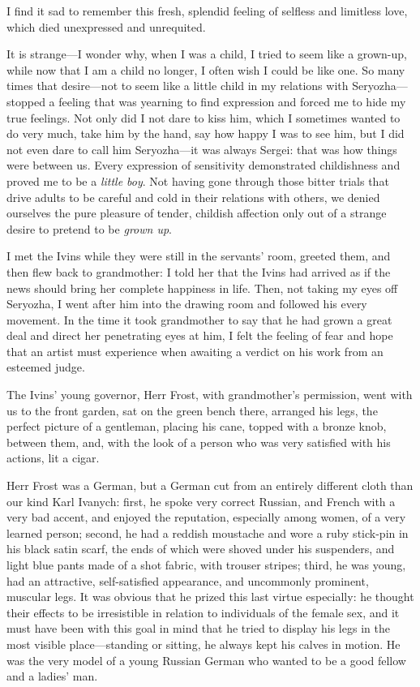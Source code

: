 I find it sad to remember this fresh, splendid feeling of selfless and limitless love, which died unexpressed and unrequited.

It is strange---I wonder why, when I was a child, I tried to seem like a grown-up, while now that I am a child no longer, I often wish I could be like one. So many times that desire---not to seem like a little child in my relations with Seryozha---stopped a feeling that was yearning to find expression and forced me to hide my true feelings. Not only did I not dare to kiss him, which I sometimes wanted to do very much, take him by the hand, say how happy I was to see him, but I did not even dare to call him Seryozha---it was always Sergei: that was how things were between us. Every expression of sensitivity demonstrated childishness and proved me to be a \emph{little boy}. Not having gone through those bitter trials that drive adults to be careful and cold in their relations with others, we denied ourselves the pure pleasure of tender, childish affection only out of a strange desire to pretend to be \emph{grown up}.

I met the Ivins while they were still in the servants' room, greeted them, and then flew back to grandmother: I told her that the Ivins had arrived as if the news should bring her complete happiness in life. Then, not taking my eyes off Seryozha, I went after him into the drawing room and followed his every movement. In the time it took grandmother to say that he had grown a great deal and direct her penetrating eyes at him, I felt the feeling of fear and hope that an artist must experience when awaiting a verdict on his work from an esteemed judge.

The Ivins' young governor, Herr Frost, with grandmother's permission, went with us to the front garden, sat on the green bench there, arranged his legs, the perfect picture of a gentleman, placing his cane, topped with a bronze knob, between them, and, with the look of a person who was very satisfied with his actions, lit a cigar.

Herr Frost was a German, but a German cut from an entirely different cloth than our kind Karl Ivanych: first, he spoke very correct Russian, and French with a very bad accent, and enjoyed the reputation, especially among women, of a very learned person; second, he had a reddish moustache and wore a ruby stick-pin in his black satin scarf, the ends of which were shoved under his suspenders, and light blue pants made of a shot fabric, with trouser stripes; third, he was young, had an attractive, self-satisfied appearance, and uncommonly prominent, muscular legs. It was obvious that he prized this last virtue especially: he thought their effects to be irresistible in relation to individuals of the female sex, and it must have been with this goal in mind that he tried to display his legs in the most visible place---standing or sitting, he always kept his calves in motion. He was the very model of a young Russian German who wanted to be a good fellow and a ladies' man.

